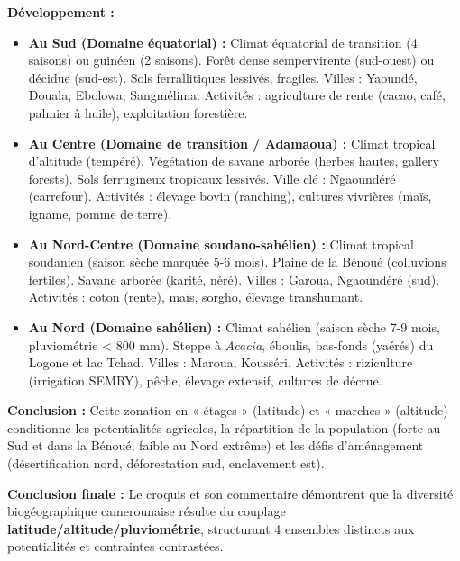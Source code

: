 \documentclass[11pt]{article}
\begin{document}
\begin{exoresolu}
\textbf{Développement :}
\begin{itemize}
    \item \textbf{Au Sud (Domaine équatorial) :} Climat équatorial de transition (4 saisons) ou guinéen (2 saisons). Forêt dense sempervirente (sud-ouest) ou décidue (sud-est). Sols ferrallitiques lessivés, fragiles. Villes : Yaoundé, Douala, Ebolowa, Sangmélima. Activités : agriculture de rente (cacao, café, palmier à huile), exploitation forestière.
    \item \textbf{Au Centre (Domaine de transition / Adamaoua) :} Climat tropical d'altitude (tempéré). Végétation de savane arborée (herbes hautes, gallery forests). Sols ferrugineux tropicaux lessivés. Ville clé : Ngaoundéré (carrefour). Activités : élevage bovin (ranching), cultures vivrières (maïs, igname, pomme de terre).
    \item \textbf{Au Nord-Centre (Domaine soudano-sahélien) :} Climat tropical soudanien (saison sèche marquée 5-6 mois). Plaine de la Bénoué (colluvions fertiles). Savane arborée (karité, néré). Villes : Garoua, Ngaoundéré (sud). Activités : coton (rente), maïs, sorgho, élevage transhumant.
    \item \textbf{Au Nord (Domaine sahélien) :} Climat sahélien (saison sèche 7-9 mois, pluviométrie < 800 mm). Steppe à \emph{Acacia}, éboulis, bas-fonds (yaérés) du Logone et lac Tchad. Villes : Maroua, Kousséri. Activités : riziculture (irrigation SEMRY), pêche, élevage extensif, cultures de décrue.
\end{itemize}

\textbf{Conclusion :} Cette zonation en « étages » (latitude) et « marches » (altitude) conditionne les potentialités agricoles, la répartition de la population (forte au Sud et dans la Bénoué, faible au Nord extrême) et les défis d'aménagement (désertification nord, déforestation sud, enclavement est).

\textbf{Conclusion finale :} Le croquis et son commentaire démontrent que la diversité biogéographique camerounaise résulte du couplage \textbf{latitude/altitude/pluviométrie}, structurant 4 ensembles distincts aux potentialités et contraintes contrastées.
\end{exoresolu}
\end{document}

